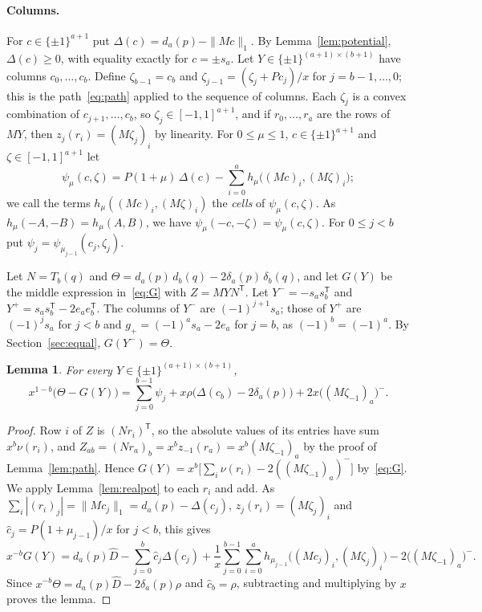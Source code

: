 \documentclass[11pt]{article}
\newtheorem{lemma}[theorem]{Lemma}
\theoremstyle{remark}
\begin{document}
\paragraph{Columns.} For $c\in\{\pm1\}^{a+1}$ put $\Delta(c)=d_a(p)-\|Mc\|_1$.
By Lemma~\ref{lem:potential}, $\Delta(c)\ge0$, with equality exactly for
$c=\pm s_a$. Let $Y\in\{\pm1\}^{(a+1)\times(b+1)}$ have columns
$c_0,\dots,c_b$. Define $\zeta_{b-1}=c_b$ and $\zeta_{j-1}=(\zeta_j+Pc_j)/x$
for $j=b-1,\dots,0$; this is the path~\eqref{eq:path} applied to the sequence
of columns. Each $\zeta_j$ is a convex combination of $c_{j+1},\dots,c_b$, so
$\zeta_j\in[-1,1]^{a+1}$, and if $r_0,\dots,r_a$ are the rows of $MY$, then
$z_j(r_i)=(M\zeta_j)_i$ by linearity. For $0\le\mu\le1$,
$c\in\{\pm1\}^{a+1}$ and $\zeta\in[-1,1]^{a+1}$ let
\[
\psi_\mu(c,\zeta)=P(1+\mu)\,\Delta(c)-\sum_{i=0}^{a}
h_\mu\bigl((Mc)_i,(M\zeta)_i\bigr);
\]
we call the terms $h_\mu((Mc)_i,(M\zeta)_i)$ the \emph{cells} of
$\psi_\mu(c,\zeta)$. As $h_\mu(-A,-B)=h_\mu(A,B)$, we have
$\psi_\mu(-c,-\zeta)=\psi_\mu(c,\zeta)$. For $0\le j<b$ put
$\psi_j=\psi_{\mu_{j-1}}(c_j,\zeta_j)$.

Let $N=T_b(q)$ and $\Theta=d_a(p)\,d_b(q)-2\delta_a(p)\,\delta_b(q)$, and let
$G(Y)$ be the middle expression in~\eqref{eq:G} with $Z=MYN^{\mathsf T}$. Let
$Y^-=-s_as_b^{\mathsf T}$ and $Y^+=s_as_b^{\mathsf T}-2e_ae_b^{\mathsf T}$.
The columns of $Y^-$ are $(-1)^{j+1}s_a$; those of $Y^+$ are $(-1)^js_a$ for
$j<b$ and $g_+=(-1)^as_a-2e_a$ for $j=b$, as $(-1)^b=(-1)^a$. By
Section~\ref{sec:equal}, $G(Y^-)=\Theta$.

\begin{lemma}\label{lem:colid}
For every $Y\in\{\pm1\}^{(a+1)\times(b+1)}$,
\[
x^{1-b}\bigl(\Theta-G(Y)\bigr)=\sum_{j=0}^{b-1}\psi_j
+x\rho\bigl(\Delta(c_b)-2\delta_a(p)\bigr)+2x\bigl((M\zeta_{-1})_a\bigr)^-.
\]
\end{lemma}
\begin{proof}
Row $i$ of $Z$ is $(Nr_i)^{\mathsf T}$, so the absolute values of its entries
have sum $x^b\nu(r_i)$, and $Z_{ab}=(Nr_a)_b=x^bz_{-1}(r_a)=x^b(M\zeta_{-1})_a$
by the proof of Lemma~\ref{lem:path}. Hence
$G(Y)=x^b\bigl[\sum_i\nu(r_i)-2((M\zeta_{-1})_a)^-\bigr]$ by~\eqref{eq:G}. We
apply Lemma~\ref{lem:realpot} to each $r_i$ and add. As
$\sum_i|(r_i)_j|=\|Mc_j\|_1=d_a(p)-\Delta(c_j)$, $z_j(r_i)=(M\zeta_j)_i$ and
$\hat c_j=P(1+\mu_{j-1})/x$ for $j<b$, this gives
\[
x^{-b}G(Y)=d_a(p)\hat D-\sum_{j=0}^{b}\hat c_j\Delta(c_j)
+\frac1x\sum_{j=0}^{b-1}\sum_{i=0}^{a}h_{\mu_{j-1}}\bigl((Mc_j)_i,(M\zeta_j)_i\bigr)
-2\bigl((M\zeta_{-1})_a\bigr)^-.
\]
Since $x^{-b}\Theta=d_a(p)\hat D-2\delta_a(p)\rho$ and $\hat c_b=\rho$,
subtracting and multiplying by $x$ proves the lemma.
\end{proof}
\end{document}
